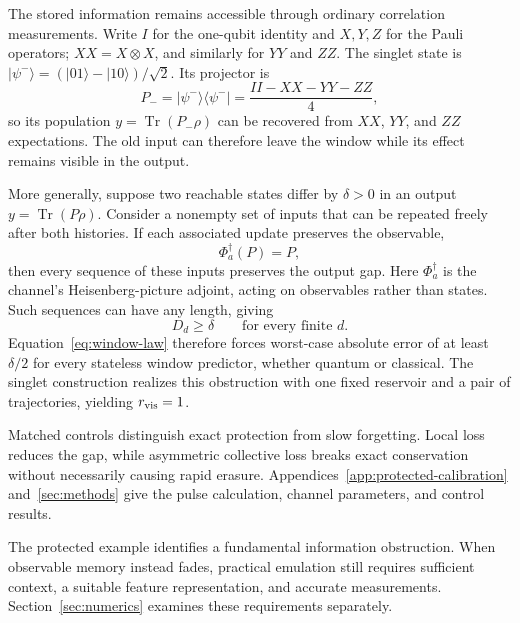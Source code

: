 The stored information remains accessible through ordinary correlation
measurements. Write $I$ for the one-qubit identity and $X,Y,Z$ for the
Pauli operators; $XX=X\otimes X$, and similarly for $YY$ and $ZZ$.
The singlet state is $|\psi^-\rangle=(|01\rangle-|10\rangle)/\sqrt2$.
Its projector is
\begin{equation}
 P_-=|\psi^-\rangle\!\langle\psi^-|
 =\frac{II-XX-YY-ZZ}{4},
 \label{eq:protected-singlet}
\end{equation}
so its population $y=\operatorname{Tr}(P_-\rho)$ can be recovered from
$XX$, $YY$, and $ZZ$ expectations. The old input can therefore leave the
window while its effect remains visible in the output.

More generally, suppose two reachable states differ by $\delta>0$ in an
output $y=\operatorname{Tr}(P\rho)$. Consider a nonempty set of inputs that
can be repeated freely after both histories. If each associated update
preserves the observable,
\[
 \Phi_a^\dagger(P)=P,
\]
then every sequence of these inputs preserves the output gap.
Here $\Phi_a^\dagger$ is the channel's Heisenberg-picture adjoint,
acting on observables rather than states.
Such sequences can have any length, giving
\begin{equation}
 D_d\geq\delta\qquad\text{for every finite }d.
 \label{eq:protected-mode}
\end{equation}
Equation~\eqref{eq:window-law} therefore forces worst-case absolute error
of at least $\delta/2$ for every stateless window predictor, whether
quantum or classical. The singlet construction realizes this obstruction
with one fixed reservoir and a pair of trajectories, yielding $r_{\rm vis}=1$.

Matched controls distinguish exact protection from slow forgetting.
Local loss reduces the gap, while asymmetric collective loss breaks exact
conservation without necessarily causing rapid erasure.
Appendices~\ref{app:protected-calibration} and~\ref{sec:methods} give the
pulse calculation, channel parameters, and control results.

The protected example identifies a fundamental information obstruction.
When observable memory instead fades, practical emulation still requires
sufficient context, a suitable feature representation, and accurate
measurements. Section~\ref{sec:numerics} examines these requirements separately.
